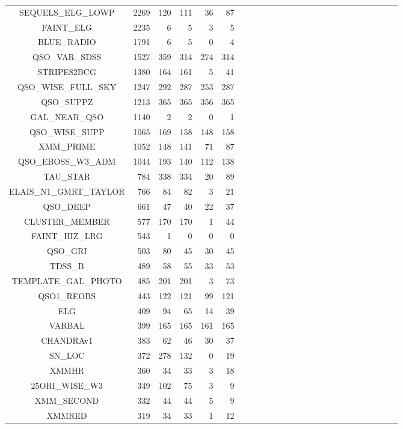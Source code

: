 \documentclass[onecolumn]{aa}
\begin{document}
\begin{center}
\begin{longtable}{c r rrrr rrrr rrrrr rrrrr rrrrr}
SEQUELS\_ELG\_LOWP 	& 2269   & 120   & 111   & 36 & 87 		\\
FAINT\_ELG 		& 2235   & 6     & 5     & 3 & 5 		\\
BLUE\_RADIO 		& 1791   & 6     & 5     & 0 & 4 		\\
QSO\_VAR\_SDSS 		& 1527   & 359   & 314   & 274 & 314 		\\
STRIPE82BCG 		& 1380   & 164   & 161   & 5 & 41 		\\
QSO\_WISE\_FULL\_SKY 	& 1247   & 292   & 287   & 253 & 287 		\\
QSO\_SUPPZ 		& 1213   & 365   & 365   & 356 & 365 		\\
GAL\_NEAR\_QSO 		& 1140   & 2     & 2     & 0 & 1 		\\
QSO\_WISE\_SUPP 	& 1065   & 169   & 158   & 148 & 158 		\\
XMM\_PRIME 		& 1052   & 148   & 141   & 71 & 87 		\\
QSO\_EBOSS\_W3\_ADM 	& 1044   & 193   & 140   & 112 & 138 		\\
TAU\_STAR 		& 784    & 338   & 334   & 20 & 89 		\\
ELAIS\_N1\_GMRT\_TAYLOR & 766    & 84    & 82    & 3 & 21 		\\
QSO\_DEEP 		& 661    & 47    & 40    & 22 & 37 		\\
CLUSTER\_MEMBER 	& 577    & 170   & 170   & 1 & 44 		\\
FAINT\_HIZ\_LRG 	& 543    & 1     & 0     & 0 & 0 		\\
QSO\_GRI 		& 503    & 80    & 45    & 30 & 45 		\\
TDSS\_B 		& 489    & 58    & 55    & 33 & 53 		\\
TEMPLATE\_GAL\_PHOTO 	& 485    & 201   & 201   & 3 & 73 		\\
QSO1\_REOBS 		& 443    & 122   & 121   & 99 & 121 		\\
ELG 			& 409    & 94    & 65    & 14 & 39 		\\
VARBAL 			& 399    & 165   & 165   & 161 & 165 		\\
CHANDRAv1 		& 383    & 62    & 46    & 30 & 37 		\\
SN\_LOC 		& 372    & 278   & 132   & 0 & 19 		\\
XMMHR 			& 360    & 34    & 33    & 3 & 18 		\\
25ORI\_WISE\_W3 	& 349    & 102   & 75    & 3 & 9 		\\
XMM\_SECOND 		& 332    & 44    & 44    & 5 & 9 		\\
XMMRED			& 319    & 34    & 33    & 1 & 12 		\\

\end{longtable}
\end{center}
\end{document}
